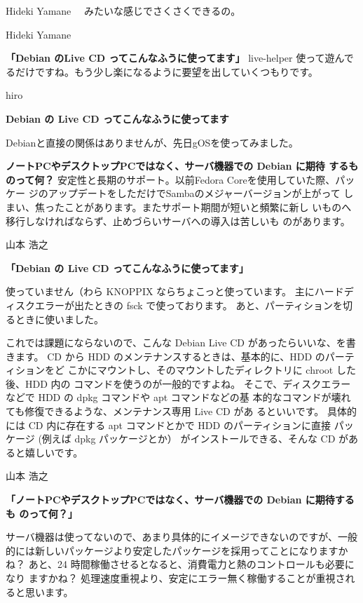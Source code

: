 \documentclass[cjk,dvipdfmx,12pt]{beamer}
\begin{document}
\begin{frame}[containsverbatim]{Hideki Yamane}
　みたいな感じでさくさくできるの。

\end{frame}\begin{frame}{Hideki Yamane}

\textbf{「Debian のLive CD ってこんなふうに使ってます」}
 live-helper 使って遊んでるだけですね。もう少し楽になるように要望を出していくつもりです。

\end{frame}\begin{frame}{hiro}

\textbf{Debian の Live CD ってこんなふうに使ってます}

Debianと直接の関係はありませんが、先日gOSを使ってみました。

\textbf{ノートPCやデスクトップPCではなく、サーバ機器での Debian に期待
するものって何？}
安定性と長期のサポート。以前Fedora Coreを使用していた際、パッケー
ジのアップデートをしただけでSambaのメジャーバージョンが上がって
しまい、焦ったことがあります。またサポート期間が短いと頻繁に新し
いものへ移行しなければならず、止めづらいサーバへの導入は苦しいも
のがあります。

\end{frame}\begin{frame}{山本 浩之}

\textbf{「Debian の Live CD ってこんなふうに使ってます」}

使っていません（わら
KNOPPIX ならちょこっと使っています。
主にハードディスクエラーが出たときの fsck で使っております。
あと、パーティションを切るときに使いました。

これでは課題にならないので、こんな Debian Live CD があったらいいな、を書
きます。
CD から HDD のメンテナンスするときは、基本的に、HDD のパーティションをど
こかにマウントし、そのマウントしたディレクトリに chroot した後、HDD 内の
コマンドを使うのが一般的ですよね。
そこで、ディスクエラーなどで HDD の dpkg コマンドや apt コマンドなどの基
本的なコマンドが壊れても修復できるような、メンテナンス専用 Live CD があ
るといいです。
具体的には CD 内に存在する apt コマンドとかで HDD のパーティションに直接
パッケージ (例えば dpkg パッケージとか） がインストールできる、そんな CD
があると嬉しいです。

\end{frame}\begin{frame}{山本 浩之}

\textbf{「ノートPCやデスクトップPCではなく、サーバ機器での Debian に期待するも
のって何？」}

サーバ機器は使ってないので、あまり具体的にイメージできないのですが、一般
的には新しいパッケージより安定したパッケージを採用ってことになりますかね？
あと、24 時間稼働させるとなると、消費電力と熱のコントロールも必要になり
ますかね？
処理速度重視より、安定にエラー無く稼働することが重視されると思います。


\end{frame}
\end{document}
